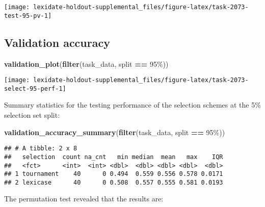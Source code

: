 \documentclass[
]{book}
\newenvironment{Shaded}{\begin{snugshade}}{\end{snugshade}}
\newcommand{\FunctionTok}[1]{\textcolor[rgb]{0.13,0.29,0.53}{\textbf{#1}}}
\newcommand{\NormalTok}[1]{#1}
\newcommand{\SpecialCharTok}[1]{\textcolor[rgb]{0.81,0.36,0.00}{\textbf{#1}}}
\newcommand{\StringTok}[1]{\textcolor[rgb]{0.31,0.60,0.02}{#1}}
\begin{document}
\texttt{[image: lexidate-holdout-supplemental\_files/figure-latex/task-2073-test-95-pv-1]}

\hypertarget{validation-accuracy-44}{%
\subsection{Validation accuracy}\label{validation-accuracy-44}}

\begin{Shaded}
\begin{Highlighting}[]
\FunctionTok{validation\_plot}\NormalTok{(}\FunctionTok{filter}\NormalTok{(task\_data, split }\SpecialCharTok{==} \StringTok{\textquotesingle{}95\%\textquotesingle{}}\NormalTok{))}
\end{Highlighting}
\end{Shaded}

\texttt{[image: lexidate-holdout-supplemental\_files/figure-latex/task-2073-select-95-perf-1]}

Summary statistics for the testing performance of the selection schemes at the 5\% selection set split:

\begin{Shaded}
\begin{Highlighting}[]
\FunctionTok{validation\_accuracy\_summary}\NormalTok{(}\FunctionTok{filter}\NormalTok{(task\_data, split }\SpecialCharTok{==} \StringTok{\textquotesingle{}95\%\textquotesingle{}}\NormalTok{))}
\end{Highlighting}
\end{Shaded}

\begin{verbatim}
## # A tibble: 2 x 8
##   selection  count na_cnt   min median  mean   max    IQR
##   <fct>      <int>  <int> <dbl>  <dbl> <dbl> <dbl>  <dbl>
## 1 tournament    40      0 0.494  0.559 0.556 0.578 0.0171
## 2 lexicase      40      0 0.508  0.557 0.555 0.581 0.0193
\end{verbatim}

The permutation test revealed that the results are:
\end{document}
